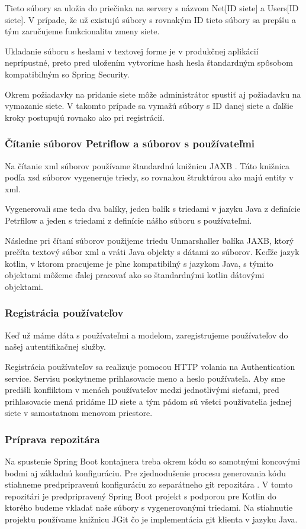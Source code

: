 Tieto súbory sa uložia do priečinka na servery s názvom Net[ID siete] a Users[ID siete]. V prípade, že už existujú súbory s rovnakým ID tieto súbory sa prepíšu a tým zaručujeme funkcionalitu zmeny siete.

Ukladanie súboru s heslami v textovej forme je v produkčnej aplikácií neprípustné, preto pred uložením vytvoríme hash hesla štandardným spôsobom kompatibilným so Spring Security.

Okrem požiadavky na pridanie siete môže administrátor spustiť aj požiadavku na vymazanie siete. V takomto prípade sa vymažú súbory s ID danej siete a ďalšie kroky postupujú rovnako ako pri registrácií.

\subsubsection{Čítanie súborov Petriflow a súborov s používateľmi}
Na čítanie \acrshort{xml} súborov používame štandardnú knižnicu JAXB \cite{jaxb}. Táto knižnica podľa \acrshort{xsd} súborov vygeneruje triedy, so rovnakou štruktúrou ako majú entity v \acrshort{xml}.

Vygenerovali sme teda dva balíky, jeden balík s triedami v jazyku Java z definície Petrfilow a jeden s triedami z definície nášho súboru s používateľmi.

Následne pri čítaní súborov použijeme triedu Unmarshaller balíka JAXB, ktorý prečíta textový súbor \acrshort{xml} a vráti Java objekty s dátami zo súborov. Keďže jazyk kotlin, v ktorom pracujeme je plne kompatibilný s jazykom Java, s týmito objektami môžeme ďalej pracovať ako so štandardnými kotlin dátovými objektami.

\subsubsection{Registrácia používateľov}
Keď už máme dáta s používateľmi a modelom, zaregistrujeme používateľov do našej autentifikačnej služby.

Registrácia používateľov sa realizuje pomocou HTTP volania na Authentication service. Servisu poskytneme prihlasovacie meno a heslo používateľa. Aby sme predišli konfliktom v menách používateľov medzi jednotlivými sieťami, pred prihlasovacie mená pridáme ID siete a tým pádom sú všetci používatelia jednej siete v samostatnom menovom priestore.

\subsubsection{Príprava repozitára}
Na spustenie Spring Boot kontajnera treba okrem kódu so samotnými koncovými bodmi aj základnú konfiguráciu. Pre zjednodušenie procesu generovania kódu stiahneme predpripravenú konfiguráciu zo separátneho git repozitára \cite{dp_relay}. V tomto repozitári je predpripravený Spring Boot projekt s podporou pre Kotlin do ktorého budeme vkladať naše súbory s vygenerovanými triedami. Na stiahnutie projektu používame knižnicu JGit \cite{jgit} čo je implementácia git klienta v jazyku Java.

